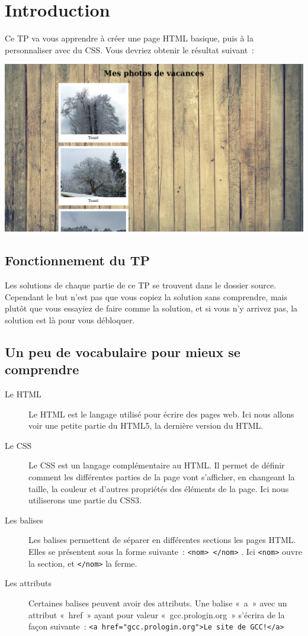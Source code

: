 \section{Introduction}
Ce TP va vous apprendre à créer une page HTML basique, puis à la personnaliser
avec du CSS. Vous devriez obtenir le résultat suivant :

\begin{center}\includegraphics[width=.8\linewidth]{img/screenshot_text-align.png}\end{center}

\subsection{Fonctionnement du TP}
Les solutions de chaque partie de ce TP se trouvent dans le dossier source.
Cependant le but n'est pas que vous copiez la solution sans comprendre, mais
plutôt que vous essayiez de faire comme la solution, et si vous n'y arrivez pas,
la solution est là pour vous débloquer.

\subsection{Un peu de vocabulaire pour mieux se comprendre}
\begin{description}
	\item[Le HTML] Le HTML est le langage utilisé pour écrire des pages web.
		Ici nous allons voir une petite partie du HTML5, la dernière
		version du HTML.
	\item[Le CSS] Le CSS est un langage complémentaire au HTML. Il permet de
		définir comment les différentes parties de la page vont
		s’afficher, en changeant la taille, la couleur et d’autres
		propriétés des éléments de la page. Ici nous utiliserons une
		partie du CSS3.
	\item[Les balises] Les balises permettent de séparer en différentes
		sections les pages HTML. Elles se présentent sous la forme
		suivante : \texttt{<nom> </nom>} . Ici
		\texttt{<nom>} ouvre la section, et
		\texttt{</nom>} la ferme.
	\item[Les attributs] Certaines balises peuvent avoir des attributs. Une
		balise « a » avec un attribut « href » ayant pour valeur
		« gcc.prologin.org » s’écrira de la façon suivante :
		\texttt{<a href="gcc.prologin.org">Le site de GCC!</a>}
\end{description}

